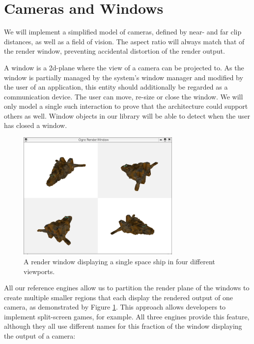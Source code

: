 \section{Cameras and Windows}
\label{chapter:design:windows}


	We will implement a simplified model of cameras, defined by near- and far clip distances, as well as a field of vision. The aspect ratio will always match that of the render window, preventing accidental distortion of the render output.

	A window is a 2d-plane where the view of a camera can be projected to. As the window is partially managed by the system's window manager and modified by the user of an application, this entity should additionally be regarded as a communication device. The user can move, re-size or close the window. We will only model a single such interaction to prove that the architecture could support others as well. Window objects in our library will be able to detect when the user has closed a window.
	
	\begin{figure}[htbp]
		\centering
		\includegraphics[width=8cm]{images/viewports/viewports.png}
		\caption{A render window displaying a single space ship in four different viewports.}
		\label{fig:ViewportExample}
	\end{figure}

	All our reference engines allow us to partition the render plane of the windows to create multiple smaller regions that each display the rendered output of one camera, as demonstrated by Figure \ref{fig:ViewportExample}. This approach allows developers to implement split-screen games, for example. All three engines provide this feature, although they all use different names for this fraction of the window displaying the output of a camera:

